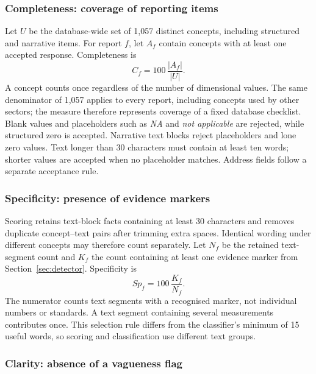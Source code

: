 \subsubsection{Completeness: coverage of reporting items}

Let $U$ be the database-wide set of 1,057 distinct concepts, including structured and narrative items. For report $f$, let $A_f$ contain concepts with at least one accepted response. Completeness is
\begin{equation}
C_f=100\,\frac{|A_f|}{|U|}.
\label{eq:complete}
\end{equation}
A concept counts once regardless of the number of dimensional values. The same denominator of 1,057 applies to every report, including concepts used by other sectors; the measure therefore represents coverage of a fixed database checklist. Blank values and placeholders such as \emph{NA} and \emph{not applicable} are rejected, while structured zero is accepted. Narrative text blocks reject placeholders and lone zero values. Text longer than 30 characters must contain at least ten words; shorter values are accepted when no placeholder matches. Address fields follow a separate acceptance rule.

\subsubsection{Specificity: presence of evidence markers}

Scoring retains text-block facts containing at least 30 characters and removes duplicate concept--text pairs after trimming extra spaces. Identical wording under different concepts may therefore count separately. Let $N_f$ be the retained text-segment count and $K_f$ the count containing at least one evidence marker from Section~\ref{sec:detector}. Specificity is
\begin{equation}
Sp_f=100\,\frac{K_f}{N_f}.
\label{eq:specificity}
\end{equation}
The numerator counts text segments with a recognised marker, not individual numbers or standards. A text segment containing several measurements contributes once. This selection rule differs from the classifier's minimum of 15 useful words, so scoring and classification use different text groups.

\subsubsection{Clarity: absence of a vagueness flag}

